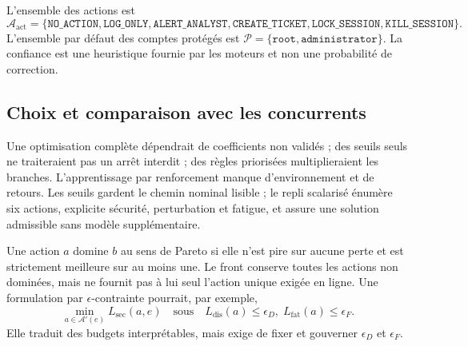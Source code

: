 \documentclass[11pt,a4paper,oneside]{report}
\theoremstyle{definition}
\theoremstyle{plain}
\begin{document}
L'ensemble des actions est
\[
\mathcal{A}_{\mathrm{act}}=
\{\texttt{NO\_ACTION},\texttt{LOG\_ONLY},\texttt{ALERT\_ANALYST},
\texttt{CREATE\_TICKET},\texttt{LOCK\_SESSION},\texttt{KILL\_SESSION}\}.
\]
L'ensemble par défaut des comptes protégés est
$\mathcal{P}=\{\texttt{root},\texttt{administrator}\}$. La confiance est une heuristique fournie par les moteurs et non une probabilité de correction.

\subsection*{Choix et comparaison avec les concurrents}

Une optimisation complète dépendrait de coefficients non validés ; des seuils
seuls ne traiteraient pas un arrêt interdit ; des règles priorisées
multiplieraient les branches. L'apprentissage par renforcement manque
d'environnement et de retours. Les seuils gardent le chemin nominal lisible ;
le repli scalarisé énumère six actions, explicite sécurité, perturbation et
fatigue, et assure une solution admissible sans modèle supplémentaire.

Une action $a$ domine $b$ au sens de Pareto si elle n'est pire sur aucune perte
et est strictement meilleure sur au moins une. Le front conserve toutes les
actions non dominées, mais ne fournit pas à lui seul l'action unique exigée en
ligne. Une formulation par $\epsilon$-contrainte pourrait, par exemple,
\begin{equation}
\min_{a\in\mathcal{A}'(e)} L_{\mathrm{sec}}(a,e)
\quad\text{sous}\quad
L_{\mathrm{dis}}(a)\leq\epsilon_D,\;
L_{\mathrm{fat}}(a)\leq\epsilon_F.
\label{eq:ai-ro-epsilon}
\end{equation}
Elle traduit des budgets interprétables, mais exige de fixer et gouverner
$\epsilon_D$ et $\epsilon_F$.
\end{document}
